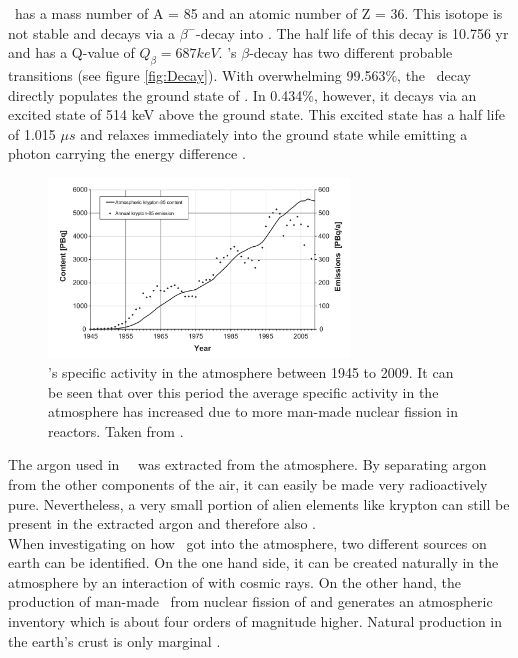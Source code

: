 \documentclass[encoding=utf8,british]{tumphthesis}
\begin{document}
\Kr\ has a mass number of A = 85 and an atomic number of Z = 36.
This isotope is not stable and decays via a $\beta^-$-decay into .
The half life of this decay is 10.756 yr and has a Q-value of $Q_\beta = 687 \unit{keV}$.
\Kr's $\beta$-decay has two different probable transitions (see figure \ref{fig:Decay}).
With overwhelming 99.563$\%$, the \Kr\ decay directly populates the ground state of .
In 0.434$\%$, however, it decays via an excited state of  514 keV above the ground state.
This excited state has a half life of 1.015 $\unit{\mu s}$ and relaxes immediately into the ground state while emitting  a photon carrying the energy difference \cite{singh_nuclear_2014}.
\\

\begin{figure}[t!]
	\centering
	\ifmakefigures%
	\includegraphics[width=80mm]{./Bilder/Kr85Aenderung.png}
	\fi%
	\caption{
	    \Kr's specific activity in the atmosphere between 1945 to 2009. 
	    It can be seen that over this period the average specific activity in the atmosphere has increased due to more man-made nuclear fission in reactors. 
		Taken from \cite{ahlswede_update_2013}.
	}
    \label{fig:Kr85Aenderung}
    
\end{figure}

The argon used in \gerda\ \PII\ was extracted from the atmosphere.
By separating argon from the other components of the air, it can easily be made very radioactively pure.
Nevertheless, a very small portion of alien elements like krypton can still be present in the extracted argon and therefore also \Kr.
\\

When investigating on how  \Kr\ got into the atmosphere, two different sources on earth can be identified.
On the one hand side, it can be created naturally in the atmosphere by an interaction of  with cosmic rays.
On the other hand, the production of man-made \Kr\ from nuclear fission of  and  generates an atmospheric inventory which is about four orders of magnitude higher.
Natural production in the earth's crust is only marginal \cite{winger_new_2005}.
\end{document}
